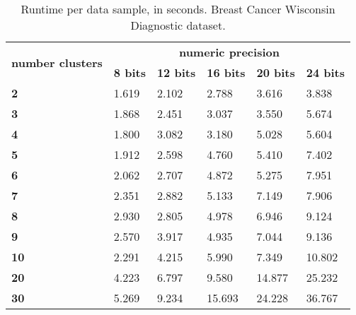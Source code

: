 \begin{table}[H]
\centering
\caption{Runtime per data sample, in seconds. Breast Cancer Wisconsin Diagnostic dataset.}
\label{table:runtimeKMBCW}
\begin{tabular}{|l|l|l|l|l|l|}
\hline
\multirow{2}{*}{\textbf{number clusters}} & \multicolumn{5}{c}{\textbf{numeric precision}}                                             \\ \cline{2-6} 
                                          & \textbf{8 bits} & \textbf{12 bits} & \textbf{16 bits} & \textbf{20 bits} & \textbf{24 bits} \\ \hline
\textbf{2}                                & 1.619           & 2.102            & 2.788            & 3.616            & 3.838            \\ \hline
\textbf{3}                                & 1.868           & 2.451            & 3.037            & 3.550            & 5.674            \\ \hline
\textbf{4}                                & 1.800           & 3.082            & 3.180            & 5.028            & 5.604            \\ \hline
\textbf{5}                                & 1.912           & 2.598            & 4.760            & 5.410            & 7.402            \\ \hline
\textbf{6}                                & 2.062           & 2.707            & 4.872            & 5.275            & 7.951            \\ \hline
\textbf{7}                                & 2.351           & 2.882            & 5.133            & 7.149            & 7.906            \\ \hline
\textbf{8}                                & 2.930           & 2.805            & 4.978            & 6.946            & 9.124            \\ \hline
\textbf{9}                                & 2.570           & 3.917            & 4.935            & 7.044            & 9.136            \\ \hline
\textbf{10}                               & 2.291           & 4.215            & 5.990            & 7.349            & 10.802           \\ \hline
\textbf{20}                               & 4.223           & 6.797            & 9.580            & 14.877           & 25.232           \\ \hline
\textbf{30}                               & 5.269           & 9.234            & 15.693           & 24.228           & 36.767           \\ \hline

\end{tabular}
\end{table}
